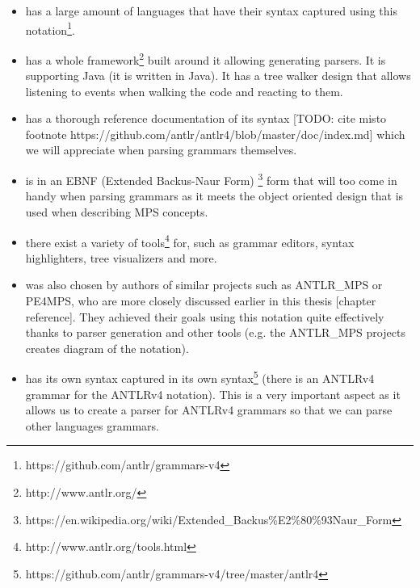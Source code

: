 \begin{itemize}
	\item has a large amount of languages that have their syntax captured using this notation\footnote{https://github.com/antlr/grammars-v4}.

	\item has a whole framework\footnote{http://www.antlr.org/} built around it allowing generating parsers. It is supporting Java (it is written in Java). It has a tree walker design that allows listening to events when walking the code and reacting to them.

	\item has a thorough reference documentation of its syntax [TODO: cite misto footnote https://github.com/antlr/antlr4/blob/master/doc/index.md] which we will appreciate when parsing grammars themselves.
	
	\item is in an EBNF (Extended Backus-Naur Form) \footnote{https://en.wikipedia.org/wiki/Extended{\_}Backus\%E2\%80\%93Naur{\_}Form} form that will too come in handy when parsing grammars as it meets the object oriented design that is used when describing MPS concepts.
	
	\item there exist a variety of tools\footnote{http://www.antlr.org/tools.html} for, such as grammar editors, syntax highlighters, tree visualizers and more.
	
	\item was also chosen by authors of similar projects such as ANTLR{\_}MPS or PE4MPS, who are more closely discussed earlier in this thesis [chapter reference]. They achieved their goals using this notation quite effectively thanks to parser generation and other tools (e.g. the ANTLR{\_}MPS projects creates diagram of the notation).
	
	\item has its own syntax captured in its own syntax\footnote{https://github.com/antlr/grammars-v4/tree/master/antlr4} (there is an ANTLRv4 grammar for the ANTLRv4 notation). This is a very important aspect as it allows us to create a parser for ANTLRv4 grammars so that we can parse other languages grammars.
\end{itemize}
